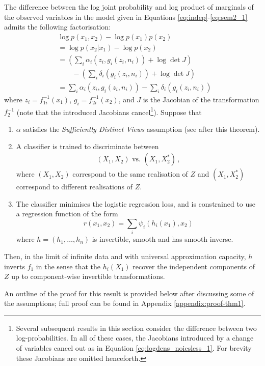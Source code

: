 \begin{theorem}
	\label{thm:noiseless1}
	The difference between the log joint probability and log product of marginals of the observed variables in the model given in Equations \ref{eq:indep}-\ref{eq:sem2_1} admits the following factorisation:
	\begin{align}
	&\log p({x}_1, {x}_2) - \log p({x}_1) p({x}_2) \nonumber \\
	&= \log p({x}_2 | {x}_1) - \log p({x}_2) \nonumber\\
	&= \left(\sum_i \alpha_i(z_{i}, g_i(z_i, n_i)) + \log \det J \right) \nonumber\\
	&\qquad - \left( \sum_i \delta_i(g_i(z_i, n_i)) + \log \det J\right) \nonumber\\
	&= \sum_i \alpha_i(z_{i}, g_i(z_i, n_i)) - \sum_i \delta_i(g_i(z_i, n_i))\label{eq:logdens_noiesless_1} \,
	\end{align}
	where $z_i=f^{-1}_{1i}({x}_1)$, $g_i=f^{-1}_{2i}({x}_2)$,
	and $J$ is the Jacobian of the transformation $f^{-1}_2$ (note that the introduced Jacobians cancel\footnote{Several subsequent results in this section consider the difference between two log-probabilities.
In all of these cases, the Jacobians introduced by a change of variables cancel out as in Equation \ref{eq:logdens_noiesless_1}.
For brevity these Jacobians are omitted henceforth.}).
	Suppose that
	\begin{enumerate}
		\item $\alpha$ satisfies the \emph{Sufficiently Distinct Views} assumption (see after this theorem).
		\item A classifier is trained to discriminate between
		\begin{align*}
		(X_{1},X_{2}) \text{ vs. } (X_{1},X_{2}^{*})\,,
		\end{align*}
		where $({X}_{1},{X}_{2})$ correspond to the same realisation of $Z$ and $({X}_{1},{X}_{2}^{*})$ correspond to different realisations of ${Z}$.
		\item The classifier minimises the logistic regression loss, and is constrained to use a regression function of the form
		\begin{equation*}
		r({x}_{1},{x}_{2})=\sum_{i}\psi_{i}(h_{i}({x}_{1}),{x}_{2})
		\end{equation*}
		where ${h} =(h_{1}, \ldots, h_{n})$  is invertible, smooth and has smooth inverse.
	\end{enumerate}
	
	Then, in the limit of infinite data and with universal approximation capacity, $h$ inverts ${f}_1$ in the sense that the $h_{i}(X_1)$ recover the independent components of $Z$ up to component-wise invertible transformations.
\end{theorem}
An outline of the proof for this result is provided below after discussing some of the assumptions; full proof can be found in Appendix \ref{appendix:proof-thm1}.

